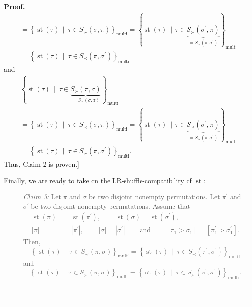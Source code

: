 \documentclass[numbers=enddot,12pt,final,onecolumn,notitlepage]{scrartcl}%
\theoremstyle{definition}
\newenvironment{statement}{\begin{quote}}{\end{quote}}
\newenvironment{proof}[1][Proof]{\noindent\textbf{#1.} }{\ \rule{0.5em}{0.5em}}
\begin{document}
\begin{proof}
\begin{align*}
&  =\left\{  \operatorname*{st}\left(  \tau\right)  \ \mid\ \tau\in S_{\succ
}\left(  \sigma,\pi\right)  \right\}  _{\operatorname*{multi}}=\left\{
\operatorname*{st}\left(  \tau\right)  \ \mid\ \tau\in\underbrace{S_{\succ
}\left(  \sigma^{\prime},\pi\right)  }_{=S_{\prec}\left(  \pi,\sigma^{\prime
}\right)  }\right\}  _{\operatorname*{multi}}\\
&  =\left\{  \operatorname*{st}\left(  \tau\right)  \ \mid\ \tau\in S_{\prec
}\left(  \pi,\sigma^{\prime}\right)  \right\}  _{\operatorname*{multi}}%
\end{align*}
and%
\begin{align*}
&  \left\{  \operatorname*{st}\left(  \tau\right)  \ \mid\ \tau\in
\underbrace{S_{\succ}\left(  \pi,\sigma\right)  }_{=S_{\prec}\left(
\sigma,\pi\right)  }\right\}  _{\operatorname*{multi}}\\
&  =\left\{  \operatorname*{st}\left(  \tau\right)  \ \mid\ \tau\in S_{\prec
}\left(  \sigma,\pi\right)  \right\}  _{\operatorname*{multi}}=\left\{
\operatorname*{st}\left(  \tau\right)  \ \mid\ \tau\in\underbrace{S_{\prec
}\left(  \sigma^{\prime},\pi\right)  }_{=S_{\succ}\left(  \pi,\sigma^{\prime
}\right)  }\right\}  _{\operatorname*{multi}}\\
&  =\left\{  \operatorname*{st}\left(  \tau\right)  \ \mid\ \tau\in S_{\succ
}\left(  \pi,\sigma^{\prime}\right)  \right\}  _{\operatorname*{multi}}.
\end{align*}
Thus, Claim 2 is proven.]

Finally, we are ready to take on the LR-shuffle-compatibility of
$\operatorname*{st}$:

\begin{statement}
\textit{Claim 3:} Let $\pi$ and $\sigma$ be two disjoint nonempty
permutations. Let $\pi^{\prime}$ and $\sigma^{\prime}$ be two disjoint
nonempty permutations. Assume that%
\begin{align*}
\operatorname*{st}\left(  \pi\right)   &  =\operatorname*{st}\left(
\pi^{\prime}\right)  ,\ \ \ \ \ \ \ \ \ \ \operatorname*{st}\left(
\sigma\right)  =\operatorname*{st}\left(  \sigma^{\prime}\right)  ,\\
\left\vert \pi\right\vert  &  =\left\vert \pi^{\prime}\right\vert
,\ \ \ \ \ \ \ \ \ \ \left\vert \sigma\right\vert =\left\vert \sigma^{\prime
}\right\vert \ \ \ \ \ \ \ \ \ \ \text{and}\ \ \ \ \ \ \ \ \ \ \left[  \pi
_{1}>\sigma_{1}\right]  =\left[  \pi_{1}^{\prime}>\sigma_{1}^{\prime}\right]
.
\end{align*}
Then,
\[
\left\{  \operatorname*{st}\left(  \tau\right)  \ \mid\ \tau\in S_{\prec
}\left(  \pi,\sigma\right)  \right\}  _{\operatorname*{multi}}=\left\{
\operatorname*{st}\left(  \tau\right)  \ \mid\ \tau\in S_{\prec}\left(
\pi^{\prime},\sigma^{\prime}\right)  \right\}  _{\operatorname*{multi}}%
\]
and%
\[
\left\{  \operatorname*{st}\left(  \tau\right)  \ \mid\ \tau\in S_{\succ
}\left(  \pi,\sigma\right)  \right\}  _{\operatorname*{multi}}=\left\{
\operatorname*{st}\left(  \tau\right)  \ \mid\ \tau\in S_{\succ}\left(
\pi^{\prime},\sigma^{\prime}\right)  \right\}  _{\operatorname*{multi}}.
\]


\end{statement}
\end{proof}
\end{document}
